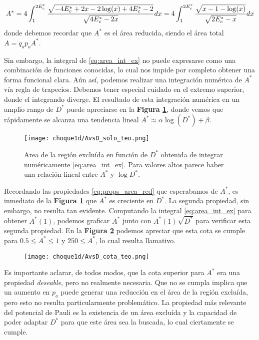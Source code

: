 \begin{equation}{\label{eq:area_int_ex}}
A^* = 4\int_{1}^{2E_c^*} \frac{\sqrt{-4E_c^* + 2x - 2\log(x) + 4E_c^* - 2}}{\sqrt{4E_c^* - 2x}} dx
= 4\int_{1}^{2E_c^*} \frac{\sqrt{x -1 - \log(x)}}{\sqrt{2E_c^* - x}} dx
\end{equation}
donde debemos recordar que $A^*$ es el área reducida, siendo el área total $A = q_op_oA^*$.

Sin embargo, la integral de \eqref{eq:area_int_ex} no puede expresarse como una combinación de funciones conocidas, lo cual nos impide por completo obtener una forma funcional clara.
Aún así, podemos realizar una integración numérica de $A^*$ vía regla de trapecios.
Debemos tener especial cuidado en el extremo superior, donde el integrando diverge.
El resultado de esta integración numérica en un amplio rango de $D^*$ puede apreciarse en la \textbf{Figura \ref{fig:AvsD_teo}}, donde vemos que rápidamente se alcanza una tendencia lineal $A^* \approx \alpha \log(D^*) + \beta$.

\begin{figure}[h]
	\centering
	\texttt{[image: choque1d/AvsD\_solo\_teo.png]}
	\caption{Area de la región excluída en función de $D^*$ obtenida de integrar numéricamente \eqref{eq:area_int_ex}. Para valores altos parece haber una relación lineal entre $A^*$ y $\log D^*$.}
	\label{fig:AvsD_teo}
\end{figure}

Recordando las propiedades \eqref{eq:props_area_red} que esperabamos de $A^*$, es inmediato de la \textbf{Figura \ref{fig:AvsD_teo}} que $A^*$ es creciente en $D^*$.
La segunda propiedad, sin embargo, no resulta tan evidente.
Computando la integral \eqref{eq:area_int_ex} para obtener $A^*(1)$, podemos graficar $A^*$ junto con $A^*(1)\sqrt{D^*}$ para verificar esta segunda propiedad.
En la \textbf{Figura \ref{fig:AvsD_teo_cota}} podemos apreciar que esta cota se cumple para  $0.5\leq A^*\leq 1$ y $250\leq A^*$, lo cual resulta llamativo.

\begin{figure}[h]
	\centering
	\texttt{[image: choque1d/AvsD\_cota\_teo.png]}
	\caption{}
	\label{fig:AvsD_teo_cota}
\end{figure}

Es importante aclarar, de todos modos, que la cota superior para $A^*$ era una propiedad \textit{deseable}, pero no realmente necesaria.
Que no se cumpla implica que un aumento en $p_o$ puede generar una reducción en el área de la región excluída, pero esto no resulta particularmente problemático.
La propiedad más relevante del potencial de Pauli es la existencia de un área excluída y la capacidad de poder adaptar $D^*$ para que este área sea la buscada, lo cual ciertamente se cumple.

